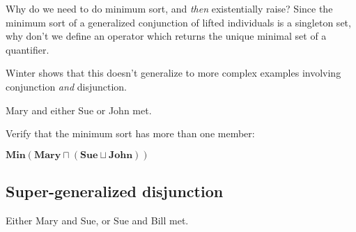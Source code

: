 \documentclass[letterpaper,parskip=half]{scrartcl}
\begin{document}
Why do we need to do minimum sort, and \emph{then} existentially raise? Since the minimum sort of a generalized conjunction of lifted individuals is a singleton set, why don't we define an operator which returns the unique minimal set of a quantifier.

Winter shows that this doesn't generalize to more complex examples involving conjunction \emph{and} disjunction.

\begin{exe}
\ex Mary and either Sue or John met.
\label{org0d14a68}
\end{exe}

Verify that the minimum sort has more than one member:

\begin{exe}
\ex \(\mathbf{Min}(\mathbf{Mary} \sqcap (\mathbf{Sue} \sqcup \mathbf{John}))\)
\label{org6a71835}
\end{exe}

\subsection{Super-generalized disjunction}
\label{sec:orgb2bdb49}

\begin{exe}
\ex Either Mary and Sue, or Sue and Bill met.
\label{orga5a4b54}
\end{exe}




\printbibliography
\end{document}
